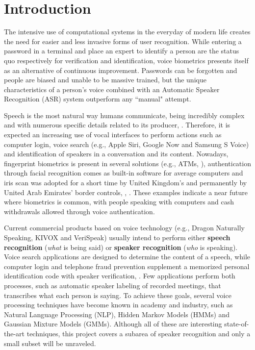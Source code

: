 \chapter{Introduction}
\label{ch:intro}

The intensive use of computational systems in the everyday of modern life creates the need for easier and less invasive forms of user recognition. While entering a password in a terminal and place an expert to identify a person are the status quo respectively for verification and identification, voice biometrics presents itself as an alternative of continuous improvement. Passwords can be forgotten and people are biased and unable to be massive trained, but the unique characteristics of a person's voice combined with an Automatic Speaker Recognition (ASR) system outperform any ``manual" attempt.

Speech is the most natural way humans communicate, being incredibly complex and with numerous specific details related to its producer, . Therefore, it is expected an increasing use of vocal interfaces to perform actions such as computer login, voice search (e.g., Apple Siri, Google Now and Samsung S Voice) and identification of speakers in a conversation and its content. Nowadays, fingerprint biometrics is present in several solutions (e.g., ATMs, ), authentication through facial recognition comes as built-in software for average computers and iris scan was adopted for a short time by United Kingdom's and permanently by United Arab Emirates' border controls, , . These examples indicate a near future where biometrics is common, with people speaking with computers and cash withdrawals allowed through voice authentication.

Current commercial products based on voice technology (e.g., Dragon Naturally Speaking, KIVOX and VeriSpeak) usually intend to perform either \textbf{speech recognition} (\emph{what} is being said) or \textbf{speaker recognition} (\emph{who} is speaking). Voice search applications are designed to determine the content of a speech, while computer login and telephone fraud prevention supplement a memorized personal identification code with speaker verification, . Few applications perform both processes, such as automatic speaker labeling of recorded meetings, that transcribes what each person is saying. To achieve these goals, several voice processing techniques have become known in academy and industry, such as Natural Language Processing (NLP), Hidden Markov Models (HMMs) and Gaussian Mixture Models (GMMs). Although all of these are interesting state-of-the-art techniques, this project covers a subarea of speaker recognition and only a small subset will be unraveled.


